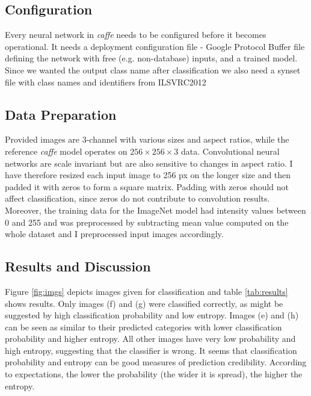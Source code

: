 \documentclass[journal, a4paper]{IEEEtran}
\begin{document}
  \subsection{Configuration}
    Every neural network in \textit{caffe} needs to be configured before it becomes operational. It needs a deployment configuration file - Google Protocol Buffer file defining the network with free (e.g. non-database) inputs, and a trained model. Since we wanted the output class name after classification we also need a synset file with class names and identifiers from ILSVRC2012 \cite{ImageNet}
   
  \subsection{Data Preparation}
    Provided images are 3-channel with various sizes and aspect ratios, while the reference \textit{caffe} model operates on $256\times 256\times 3$ data. Convolutional neural networks are scale invariant but are also sensitive to changes in aspect ratio. I have therefore resized each input image to 256 px on the longer size and then padded it with zeros to form a square matrix. Padding with zeros should not affect classification, since zeros do not contribute to convolution results. Moreover, the training data for the ImageNet model had intensity values between 0 and 255 and was preprocessed by subtracting mean value computed on the whole dataset and I preprocessed input images accordingly.
    
  \subsection{Results and Discussion}
    Figure \ref{fig:imgs} depicts images given for classification and table \ref{tab:results} shows results. Only images (f) and (g) were classified correctly, as might be suggested by high classification probability and low entropy. Images (e) and (h) can be seen as similar to their predicted categories with lower classification probability and higher entropy. All other images have very low probability and high entropy, suggesting that the classifier is wrong. It seems that classification probability and entropy can be good measures of prediction credibility. According to expectations, the lower the probability (the wider it is spread), the higher the entropy.
\end{document}
